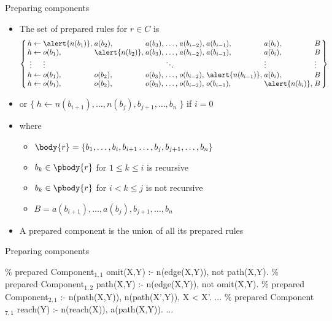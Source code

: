 \begin{frame}{Preparing components}

  \begin{itemize}
  \item The set of \alert{prepared rules} for \(r \in C\) is
    \[\arraycolsep=1.4pt
      \left\{
        \begin{array}{rcllllllll}
               h&\leftarrow&\alert{n(b_1)},&       a(b_2) ,&a(b_3),&\dots,&a(b_{i-2}),&       a(b_{i-1}) ,&       a(b_i), & B      \\
               h&\leftarrow&       o(b_1) ,&\alert{n(b_2)},&a(b_3),&\dots,&a(b_{i-2}),&       a(b_{i-1}) ,&       a(b_i), & B      \\
          \vdots&          &\vdots         &               &       &\ddots&           &                   &\vdots         & \vdots \\
               h&\leftarrow&       o(b_1) ,&       o(b_2) ,&o(b_3),&\dots,&o(b_{i-2}),&\alert{n(b_{i-1})},&       a(b_i), & B      \\
               h&\leftarrow&       o(b_1) ,&       o(b_2) ,&o(b_3),&\dots,&o(b_{i-2}),&       o(b_{i-1}) ,&\alert{n(b_i)},& B
        \end{array}
      \right\}
    \]
  \item [] or \quad \(\{\;h \leftarrow n(b_{i+1}), \dots, n(b_j), b_{j+1}, \dots, b_n\;\}\) \quad if \(i=0\)
  \item [] where
    \begin{itemize}
    \item \(\body{r} = \{ b_1, \dots, b_i, b_{i+1} \dots, b_j, b_{j+1}, \dots, b_n \}\)
    \item \(b_k\in\pbody{r}\) for \(1\leq k \leq i\) is recursive
    \item \(b_k\in\pbody{r}\) for \(i< k \leq j\) is not recursive
    \item \(B = a(b_{i+1}), \dots, a(b_j), b_{j+1}, \dots, b_n\)
    \end{itemize}
  \item<2-> A \alert{prepared component} is the union of all its prepared rules
  \end{itemize}
\end{frame}
\begin{frame}[fragile]{Preparing components}

\begin{SemiVerbatim}{.9}
{\color{comment}\% prepared Component\(_{1,1}\)}
omit(X,Y) :- \alert{n(edge(X,Y))}, not path(X,Y).
{\color{comment}\% prepared Component\(_{1,2}\)}
path(X,Y) :- \alert{n(edge(X,Y))}, not omit(X,Y).
{\color{comment}\% prepared Component\(_{2,1}\)}
:- \alert{n(path(X,Y))}, \alert{n(path(X',Y))}, X < X'.
...
{\color{comment}\% prepared Component\(_{7,1}\)}
reach(Y) :- \alert{n(reach(X))}, \alert{a(path(X,Y))}.
...
\end{SemiVerbatim}
\end{frame}

